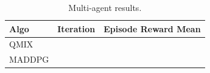 \begin{table}[h]
\centering
\caption{Multi-agent results.}
\label{tab:marlresults}
\begin{tabular}{lcc}
\toprule
Algo & Iteration & Episode Reward Mean \\
\midrule
QMIX & & \\
MADDPG & & \\
\bottomrule
\end{tabular}
\end{table}
